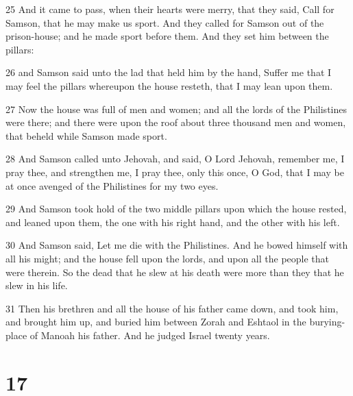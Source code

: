 \par 25 And it came to pass, when their hearts were merry, that they said, Call for Samson, that he may make us sport. And they called for Samson out of the prison-house; and he made sport before them. And they set him between the pillars:
\par 26 and Samson said unto the lad that held him by the hand, Suffer me that I may feel the pillars whereupon the house resteth, that I may lean upon them.
\par 27 Now the house was full of men and women; and all the lords of the Philistines were there; and there were upon the roof about three thousand men and women, that beheld while Samson made sport.
\par 28 And Samson called unto Jehovah, and said, O Lord Jehovah, remember me, I pray thee, and strengthen me, I pray thee, only this once, O God, that I may be at once avenged of the Philistines for my two eyes.
\par 29 And Samson took hold of the two middle pillars upon which the house rested, and leaned upon them, the one with his right hand, and the other with his left.
\par 30 And Samson said, Let me die with the Philistines. And he bowed himself with all his might; and the house fell upon the lords, and upon all the people that were therein. So the dead that he slew at his death were more than they that he slew in his life.
\par 31 Then his brethren and all the house of his father came down, and took him, and brought him up, and buried him between Zorah and Eshtaol in the burying-place of Manoah his father. And he judged Israel twenty years.

\chapter{17}

